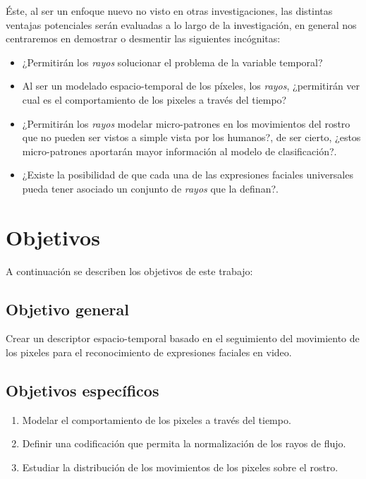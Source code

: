 Éste, al ser un enfoque nuevo no visto en otras investigaciones, las distintas ventajas potenciales serán evaluadas a lo largo de la investigación, en general nos centraremos en demostrar o desmentir las siguientes incógnitas:

\begin{itemize}
	\item ¿Permitirán los \textit{rayos} solucionar el problema de la variable temporal?
	\item Al ser un modelado espacio-temporal de los píxeles, los \textit{rayos}, ¿permitirán ver cual es el comportamiento de los pixeles a través del tiempo?
	\item ¿Permitirán los \textit{rayos} modelar micro-patrones en los movimientos del rostro que no pueden ser vistos a simple vista por los humanos?, de ser cierto, ¿estos micro-patrones aportarán mayor información al modelo de clasificación?.
	\item ¿Existe la posibilidad de que cada una de las expresiones faciales universales pueda tener asociado un conjunto de \textit{rayos} que la definan?. 
\end{itemize}


\section{Objetivos}
\label{subsec:objetivos}
A continuación se describen los objetivos de este trabajo:

\subsection{Objetivo general}
\label{subsubsec:objgeneral}
Crear un descriptor espacio-temporal basado en el seguimiento del movimiento de los pixeles para el reconocimiento de expresiones faciales en video.


\subsection{Objetivos específicos}
\label{subsubsec:objgeneral}
	\begin{enumerate}
		\item Modelar el comportamiento de los pixeles a través del tiempo.
		\item Definir una codificación que permita la normalización de los rayos de flujo.
		\item Estudiar la distribución de los movimientos de los pixeles sobre el rostro.
	\end{enumerate}
